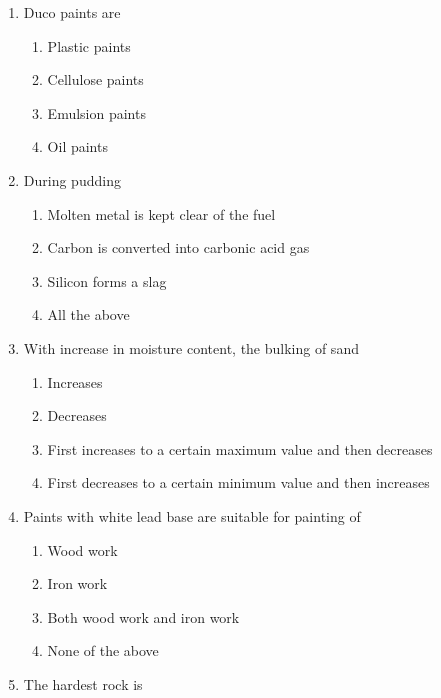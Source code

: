\documentclass[11pt,a4paper]{article}
\begin{document}
\begin{enumerate}
\item{Duco paints are}
\begin{enumerate}[label=\Alph*.]
\item{Plastic paints}
\item{Cellulose paints}
\item{Emulsion paints}
\item{Oil paints}
\end{enumerate}
\item{During pudding}
\begin{enumerate}[label=\Alph*.]
\item{Molten metal is kept clear of the fuel}
\item{Carbon is converted into carbonic acid gas}
\item{Silicon forms a slag}
\item{All the above}
\end{enumerate}
\item{With increase in moisture content, the bulking of sand}
\begin{enumerate}[label=\Alph*.]
\item{Increases}
\item{Decreases}
\item{First increases to a certain maximum value and then decreases}
\item{First decreases to a certain minimum value and then increases}
\end{enumerate}
\item{Paints with white lead base are suitable for painting of}
\begin{enumerate}[label=\Alph*.]
\item{Wood work}
\item{Iron work}
\item{Both wood work and iron work}
\item{None of the above}
\end{enumerate}
\item{The hardest rock is}
\\
\end{enumerate}
\end{document}

